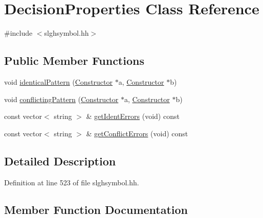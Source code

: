 \hypertarget{class_decision_properties}{}\section{Decision\+Properties Class Reference}
\label{class_decision_properties}


{\ttfamily \#include $<$slghsymbol.\+hh$>$}

\subsection*{Public Member Functions}
\begin{DoxyCompactItemize}
\item 
void \mbox{\hyperlink{class_decision_properties_a49167e9686ae2506f357100d50848e40}{identical\+Pattern}} (\mbox{\hyperlink{class_constructor}{Constructor}} $\ast$a, \mbox{\hyperlink{class_constructor}{Constructor}} $\ast$b)
\item 
void \mbox{\hyperlink{class_decision_properties_a05d2791850a7f0fe83725064a2ef027b}{conflicting\+Pattern}} (\mbox{\hyperlink{class_constructor}{Constructor}} $\ast$a, \mbox{\hyperlink{class_constructor}{Constructor}} $\ast$b)
\item 
const vector$<$ string $>$ \& \mbox{\hyperlink{class_decision_properties_a6522455b1cde86da973a068d0c9abac5}{get\+Ident\+Errors}} (void) const
\item 
const vector$<$ string $>$ \& \mbox{\hyperlink{class_decision_properties_a793e7507cdef2823782b51e2ff00e89d}{get\+Conflict\+Errors}} (void) const
\end{DoxyCompactItemize}


\subsection{Detailed Description}


Definition at line 523 of file slghsymbol.\+hh.



\subsection{Member Function Documentation}
\mbox{\label{class_decision_properties_a05d2791850a7f0fe83725064a2ef027b}} 
